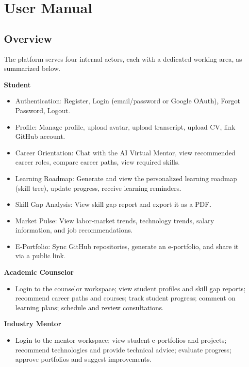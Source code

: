 \section{User Manual}

\subsection{Overview}

The platform serves four internal actors, each with a dedicated working area, as summarized below.

\textbf{Student}
\begin{itemize}[nosep]
    \item Authentication: Register, Login (email/password or Google OAuth), Forgot Password, Logout.
    \item Profile: Manage profile, upload avatar, upload transcript, upload CV, link GitHub account.
    \item Career Orientation: Chat with the AI Virtual Mentor, view recommended career roles, compare career paths, view required skills.
    \item Learning Roadmap: Generate and view the personalized learning roadmap (skill tree), update progress, receive learning reminders.
    \item Skill Gap Analysis: View skill gap report and export it as a PDF.
    \item Market Pulse: View labor-market trends, technology trends, salary information, and job recommendations.
    \item E-Portfolio: Sync GitHub repositories, generate an e-portfolio, and share it via a public link.
\end{itemize}

\textbf{Academic Counselor}
\begin{itemize}[nosep]
    \item Login to the counselor workspace; view student profiles and skill gap reports; recommend career paths and courses; track student progress; comment on learning plans; schedule and review consultations.
\end{itemize}

\textbf{Industry Mentor}
\begin{itemize}[nosep]
    \item Login to the mentor workspace; view student e-portfolios and projects; recommend technologies and provide technical advice; evaluate progress; approve portfolios and suggest improvements.
\end{itemize}

